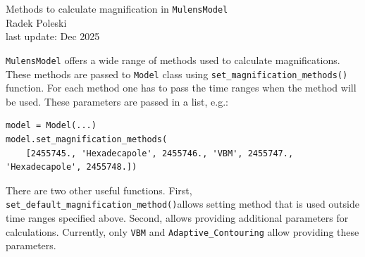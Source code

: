 \documentclass[12pt]{article}
\newcommand\MM{{\tt MulensModel}}
\begin{document}

\begin{center}
{\LARGE Methods to calculate magnification in \MM}\\
\bigskip
Radek Poleski\\
last update: Dec 2025
\end{center}

\bigskip\bigskip

{\MM} offers a wide range of methods used to calculate magnifications. 
These methods are passed to {\tt Model} class using 
{\tt set\_magnification\_methods()} function.  For each method one has to 
pass the time ranges when the method will be used.  These parameters are 
passed in a list, e.g.:

\begin{verbatim}
model = Model(...)
model.set_magnification_methods(
    [2455745., 'Hexadecapole', 2455746., 'VBM', 2455747., 'Hexadecapole', 2455748.])
\end{verbatim}

There are two other useful functions. 
First, {\tt set\_default\_magnification\_method()}\linebreak allows setting method that 
is used outside time ranges specified above.  
Second,  allows 
providing additional parameters for calculations.  Currently, only 
{\tt VBM} and {\tt Adaptive\_Contouring} allow providing these parameters. 
\end{document}
